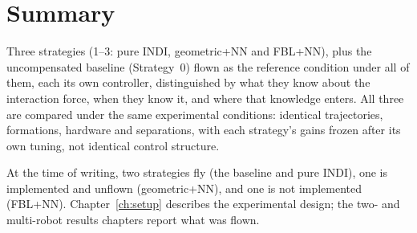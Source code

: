 \section{Summary}
\label{sec:ctrl-summary}

Three strategies (1--3: pure INDI, geometric+NN and FBL+NN), plus the uncompensated baseline
(Strategy~0) flown as the reference condition under all of them, each its own controller,
distinguished by what they know about the interaction force, when they know it, and where that
knowledge enters. All three are compared under the same experimental conditions: identical
trajectories, formations, hardware and separations, with each strategy's gains frozen after its own
tuning, not identical control structure.

At the time of writing, two strategies fly (the baseline and pure INDI), one is implemented and
unflown (geometric+NN), and one is not implemented (FBL+NN). Chapter~\ref{ch:setup} describes the experimental
design; the two- and multi-robot results chapters report what was flown.
